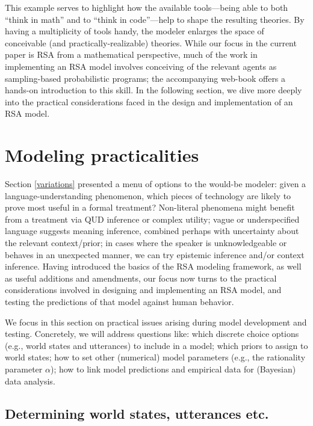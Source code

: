 \documentclass[10pt,letterpaper]{article}
\begin{document}
\bigskip

\noindent This example serves to highlight how the available tools---being able to both ``think in math'' and to ``think in code''---help to shape the resulting theories. By having a multiplicity of tools handy, the modeler enlarges the space of conceivable (and practically-realizable) theories. While our focus in the current paper is RSA from a mathematical perspective, much of the work in implementing an RSA model involves conceiving of the relevant agents as sampling-based probabilistic programs; the accompanying web-book offers a hands-on introduction to this skill. In the following section, we dive more deeply into the practical considerations faced in the design and implementation of an RSA model.

\section*{Modeling practicalities} \label{practicalities}

Section \ref{variations} presented a menu of options to the would-be modeler: given a language-understanding phenomenon, which pieces of technology are likely to prove most useful in a formal treatment? Non-literal phenomena might benefit from a treatment via QUD inference or complex utility; vague or underspecified language suggests meaning inference, combined perhaps with uncertainty about the relevant context/prior; in cases where the speaker is unknowledgeable or behaves in an unexpected manner, we can try epistemic inference and/or context inference. Having introduced the basics of the RSA modeling framework, as well as useful additions and amendments, our focus now turns to the practical considerations involved in designing and implementing an RSA model, and testing the predictions of that model against human behavior.

We focus in this section on practical issues arising during model development and testing. Concretely, we will address questions like: which discrete choice options (e.g., world states and utterances) to include in a model; which priors to assign to world states; how to set other (numerical) model parameters (e.g., the rationality parameter $\alpha$); how to link model predictions and empirical data for (Bayesian) data analysis.

\subsection*{Determining world states, utterances etc.} \label{practicalities-prior}
\end{document}
